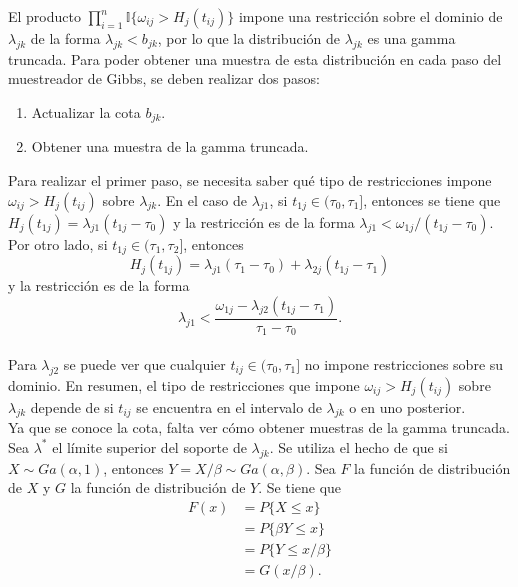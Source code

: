 \documentclass[11pt,a4paper]{article}
\begin{document}
El producto $\prod_{i=1}^n \mathbb{I}\lbrace \omega_{ij} > H_j(t_{ij}) \rbrace$ impone una restricción sobre el dominio de $\lambda_{jk}$ de la forma $\lambda_{jk} < b_{jk}$, por lo que la distribución de $\lambda_{jk}$ es una gamma truncada. Para poder obtener una muestra de esta distribución en cada paso del muestreador de Gibbs, se deben realizar dos pasos:
\begin{enumerate}
\item Actualizar la cota $b_{jk}.$
\item Obtener una muestra de la gamma truncada.\\
\end{enumerate}

Para realizar el primer paso, se necesita saber qué tipo de restricciones impone $\omega_{ij} > H_j(t_{ij})$ sobre $\lambda_{jk}$. En el caso de $\lambda_{j1}$, si $t_{1j} \in (\tau_0, \tau_1]$, entonces se tiene que $H_j(t_{1j}) = \lambda_{j1}(t_{1j} - \tau_0)$ y la restricción es de la forma $\lambda_{j1} < \omega_{1j} / (t_{1j} - \tau_0)$. Por otro lado, si $t_{1j} \in (\tau_1, \tau_2]$, entonces $$H_j(t_{1j}) = \lambda_{j1}(\tau_1 - \tau_0) + \lambda_{2j}(t_{1j} - \tau_1)$$ y la restricción es de la forma $$\lambda_{j1} < \frac{\omega_{1j}-\lambda_{j2}(t_{1j} - \tau_1)}{\tau_1 - \tau_0}.$$\\

Para $\lambda_{j2}$ se puede ver que cualquier $t_{ij} \in (\tau_0, \tau_1]$ no impone restricciones sobre su dominio. En resumen, el tipo de restricciones que impone $\omega_{ij} > H_j(t_{ij})$ sobre $\lambda_{jk}$ depende de si $t_{ij}$ se encuentra en el intervalo de $\lambda_{jk}$ o en uno posterior.\\

Ya que se conoce la cota, falta ver cómo obtener muestras de la gamma truncada. Sea $\lambda^*$ el límite superior del soporte de $\lambda_{jk}$. Se utiliza el hecho de que si $X \sim Ga(\alpha, 1)$, entonces $Y = X/\beta \sim Ga(\alpha, \beta)$. Sea $F$ la función de distribución de $X$ y $G$ la función de distribución de $Y$. Se tiene que
\begin{align*}
F(x) &= P\lbrace X \leq x\rbrace\\
&= P\lbrace \beta Y \leq x \rbrace\\
&= P\lbrace Y \leq x/\beta \rbrace\\
&= G(x/\beta).\\
\end{align*}
\end{document}
